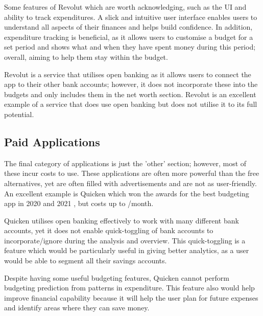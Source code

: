 Some features of Revolut which are worth acknowledging, such as the UI and ability to track expenditures. A slick and intuitive user interface enables users to understand all aspects of their finances and helps build confidence. In addition, expenditure tracking is beneficial, as it allows users to customise a budget for a set period and shows what and when they have spent money during this period; overall, aiming to help them stay within the budget.

Revolut is a service that utilises open banking as it allows users to connect the app to their other bank accounts; however, it does not incorporate these into the budgets and only includes them in the net worth section. Revolut is an excellent example of a service that does use open banking but does not utilise it to its full potential.

\subsection{Paid Applications}
\label{sec:paid-applications}
The final category of applications is just the 'other' section; however, most of these incur costs to use. These applications are often more powerful than the free alternatives, yet are often filled with advertisements and are not as user-friendly. An excellent example is Quicken which won the awards for the best budgeting app in 2020 and 2021 \cite{Quicken}, but costs up to /month.

Quicken utilises open banking effectively to work with many different bank accounts, yet it does not enable quick-toggling of bank accounts to incorporate/ignore during the analysis and overview. This quick-toggling is a feature which would be particularly useful in giving better analytics, as a user would be able to segment all their savings accounts.

Despite having some useful budgeting features, Quicken cannot perform budgeting prediction from patterns in expenditure. This feature also would help improve financial capability because it will help the user plan for future expenses and identify areas where they can save money.

